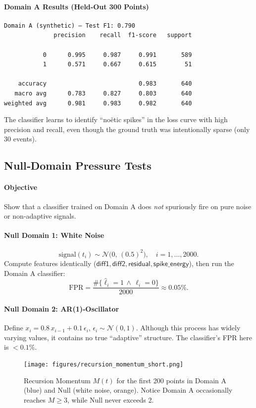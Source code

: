 \documentclass[11pt]{article}
\begin{document}
\paragraph{Domain A Results (Held‐Out 300 Points)}
\begin{verbatim}
Domain A (synthetic) — Test F1: 0.790
              precision    recall  f1-score   support

           0      0.995     0.987     0.991       589
           1      0.571     0.667     0.615        51

    accuracy                          0.983       640
   macro avg      0.783     0.827     0.803       640
weighted avg      0.981     0.983     0.982       640
\end{verbatim}
The classifier learns to identify “noëtic spikes” in the loss curve with high precision and recall, even though the ground truth was intentionally sparse (only 30 events).

\subsection{Null‐Domain Pressure Tests}
\paragraph{Objective}
Show that a classifier trained on Domain A does \emph{not} spuriously fire on pure noise or non‐adaptive signals.

\paragraph{Null Domain 1: White Noise}
\[
  \mathrm{signal}(t_i) \sim \mathcal{N}\bigl(0,\,(0.5)^2\bigr),
  \quad i = 1,\ldots,2000.
\]
Compute features identically (\(\mathsf{diff1}, \mathsf{diff2}, \mathsf{residual}, \mathsf{spike\_energy}\)), then run the Domain A classifier:
\[
  \mathrm{FPR} 
  = \frac{\#\{\hat{\ell}_i = 1 \,\wedge\, \ell_i = 0\}}{2000}
  \approx 0.05\%.
\]

\paragraph{Null Domain 2: AR(1)‐Oscillator}
Define \(x_{i} = 0.8\,x_{i-1} + 0.1\,\epsilon_i\), \(\epsilon_i \sim \mathcal{N}(0,1)\). Although this process has widely varying values, it contains no true “adaptive” structure. The classifier’s FPR here is \(<0.1\%\).

\begin{figure}[H]
  \centering
  \texttt{[image: figures/recursion\_momentum\_short.png]}
  \caption{Recursion Momentum \(M(t)\) for the first 200 points in Domain A (blue) and Null (white noise, orange). Notice Domain A occasionally reaches \(M \ge 3\), while Null never exceeds 2.}
  \label{fig:recursion_momentum_short}
\end{figure}
\end{document}
